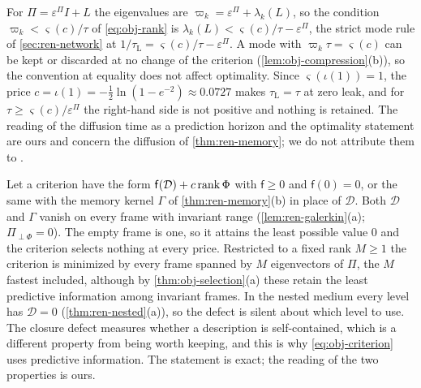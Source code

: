 For $\Pi=\varepsilon^\Pi I+L$ the eigenvalues are $\varpi_k=\varepsilon^\Pi+\lambda_k(L)$, so the condition $\varpi_k<\varsigma(c)/\tau$ of \eqref{eq:obj-rank} is $\lambda_k(L)<\varsigma(c)/\tau-\varepsilon^\Pi$, the strict mode rule of \cref{sec:ren-network} at $1/\tau_{\mathrm L}=\varsigma(c)/\tau-\varepsilon^\Pi$. A mode with $\varpi_k\tau=\varsigma(c)$ can be kept or discarded at no change of the criterion (\cref{lem:obj-compression}(b)), so the convention at equality does not affect optimality. Since $\varsigma(\iota(1))=1$, the price $c=\iota(1)=-\frac12\ln(1-e^{-2})\approx0.0727$ makes $\tau_{\mathrm L}=\tau$ at zero leak, and for $\tau\ge\varsigma(c)/\varepsilon^\Pi$ the right-hand side is not positive and nothing is retained. The reading of the diffusion time as a prediction horizon and the optimality statement are ours and concern the diffusion of \cref{thm:ren-memory}; we do not attribute them to \citet{villegas2023laplacian}.

\begin{remark}\label{rem:obj-degenerate}
Let a criterion have the form $\mathsf f(\mathcal D)+c\operatorname{rank}\Phi$ with $\mathsf f\ge0$ and $\mathsf f(0)=0$, or the same with the memory kernel $\Gamma$ of \cref{thm:ren-memory}(b) in place of $\mathcal D$. Both $\mathcal D$ and $\Gamma$ vanish on every frame with invariant range (\cref{lem:ren-galerkin}(a); $\Pi_{\perp\Phi}=0$). The empty frame is one, so it attains the least possible value $0$ and the criterion selects nothing at every price. Restricted to a fixed rank $M\ge1$ the criterion is minimized by every frame spanned by $M$ eigenvectors of $\Pi$, the $M$ fastest included, although by \cref{thm:obj-selection}(a) these retain the least predictive information among invariant frames. In the nested medium every level has $\mathcal D=0$ (\cref{thm:ren-nested}(a)), so the defect is silent about which level to use. The closure defect measures whether a description is self-contained, which is a different property from being worth keeping, and this is why \eqref{eq:obj-criterion} uses predictive information. The statement is exact; the reading of the two properties is ours.
\end{remark}


